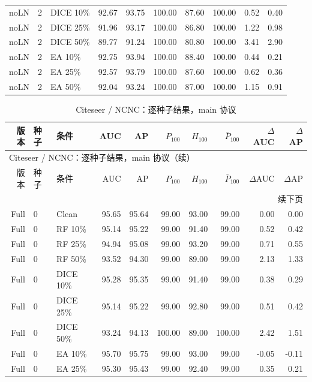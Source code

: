 {\begin{longtable}{rllrrrrrrr}
noLN & 2 & DICE 10\% & 92.67 & 93.75 & 100.00 & 87.60 & 100.00 & 0.52 & 0.40 \\
noLN & 2 & DICE 25\% & 91.96 & 93.17 & 100.00 & 86.80 & 100.00 & 1.22 & 0.98 \\
noLN & 2 & DICE 50\% & 89.77 & 91.24 & 100.00 & 80.80 & 100.00 & 3.41 & 2.90 \\
noLN & 2 & EA 10\% & 92.75 & 93.94 & 100.00 & 88.40 & 100.00 & 0.44 & 0.21 \\
noLN & 2 & EA 25\% & 92.57 & 93.79 & 100.00 & 87.60 & 100.00 & 0.62 & 0.36 \\
noLN & 2 & EA 50\% & 92.04 & 93.24 & 100.00 & 87.00 & 100.00 & 1.15 & 0.91 \\
\end{longtable}
}

{\footnotesize
\setlength{\tabcolsep}{3.2pt}
\renewcommand{\arraystretch}{1.10}
\begin{longtable}{rllrrrrrrr}
\caption{Citeseer / NCNC：逐种子结果，main 协议}\\
\toprule
版本 & 种子 & 条件 & AUC & AP & $P_{100}$ & $H_{100}$ & $\bar P_{100}$ & $\Delta$AUC & $\Delta$AP \\
\midrule
\endfirsthead
\multicolumn{10}{l}{Citeseer / NCNC：逐种子结果，main 协议（续）}\\
\toprule
版本 & 种子 & 条件 & AUC & AP & $P_{100}$ & $H_{100}$ & $\bar P_{100}$ & $\Delta$AUC & $\Delta$AP \\
\midrule
\endhead
\midrule\multicolumn{10}{r}{续下页}\\
\endfoot
\bottomrule
\endlastfoot
Full & 0 & Clean & 95.65 & 95.64 & 99.00 & 93.00 & 99.00 & 0.00 & 0.00 \\
Full & 0 & RF 10\% & 95.14 & 95.22 & 99.00 & 91.40 & 99.00 & 0.52 & 0.42 \\
Full & 0 & RF 25\% & 94.94 & 95.08 & 99.00 & 93.20 & 99.00 & 0.71 & 0.55 \\
Full & 0 & RF 50\% & 93.52 & 94.30 & 99.00 & 89.00 & 99.00 & 2.13 & 1.33 \\
Full & 0 & DICE 10\% & 95.28 & 95.35 & 99.00 & 91.40 & 99.00 & 0.38 & 0.29 \\
Full & 0 & DICE 25\% & 95.14 & 95.22 & 99.00 & 92.80 & 99.00 & 0.51 & 0.42 \\
Full & 0 & DICE 50\% & 93.24 & 94.13 & 100.00 & 89.00 & 100.00 & 2.42 & 1.51 \\
Full & 0 & EA 10\% & 95.70 & 95.75 & 99.00 & 93.00 & 99.00 & -0.05 & -0.11 \\
Full & 0 & EA 25\% & 95.30 & 95.43 & 99.00 & 92.40 & 99.00 & 0.35 & 0.21 \\

\end{longtable}}
